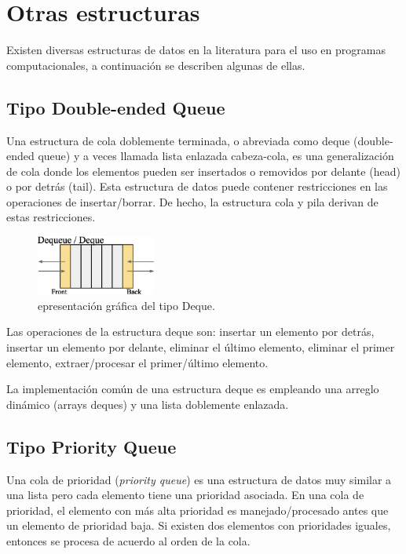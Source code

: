 \section{Otras estructuras}

Existen diversas estructuras de datos en la literatura para el uso en programas computacionales, a continuación se describen algunas de ellas.

\subsection{Tipo Double-ended Queue}

Una estructura de cola doblemente terminada, o abreviada como deque (double-ended queue) y a veces llamada lista enlazada cabeza-cola, es una generalización de cola donde los elementos pueden ser insertados o removidos por delante (head) o por detrás (tail). Esta estructura de datos puede contener restricciones en las operaciones de insertar/borrar. De hecho, la estructura cola y pila derivan de estas restricciones.

\begin{figure}[htp!]
  \begin{center}
    \includegraphics[width=0.35\textwidth]{images/deque.eps}
  \end{center}
  \caption{epresentación gráfica del tipo Deque.}
  \label{fig:deque}
\end{figure}

Las operaciones de la estructura deque son: insertar un elemento por detrás, insertar un elemento por delante, eliminar el último elemento, eliminar el primer elemento, extraer/procesar el primer/último elemento.

La implementación común de una estructura deque es empleando una arreglo dinámico (arrays deques) y una lista doblemente enlazada.

\subsection{Tipo Priority Queue}

Una cola de prioridad (\textit{priority queue}) es una estructura de datos muy similar a una lista pero cada elemento tiene una prioridad asociada. En una cola de prioridad, el elemento con más alta prioridad es manejado/procesado antes que un elemento de prioridad baja. Si existen dos elementos con prioridades iguales, entonces se procesa de acuerdo al orden de la cola.

